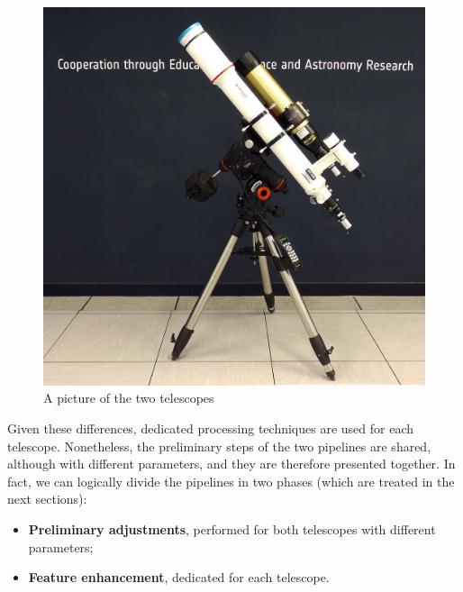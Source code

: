 \bigbreak
\begin{figure}[t!]
    \centering
    \captionsetup{justification=centering}
    \includegraphics[height=0.4\textheight]{./pictures/solar-telescopes}
    \caption{A picture of the two telescopes}
    \label{fig:solar-telescopes}
\end{figure}
\noindent Given these differences, dedicated processing techniques are used for each telescope. Nonetheless, the preliminary steps of the two pipelines are shared, although with different parameters, and they are therefore presented together. In fact, we can logically divide the pipelines in two phases (which are treated in the next sections):
\begin{itemize}
  \item \textbf{Preliminary adjustments}, performed for both telescopes with different parameters;
  \item \textbf{Feature enhancement}, dedicated for each telescope.
\end{itemize}

